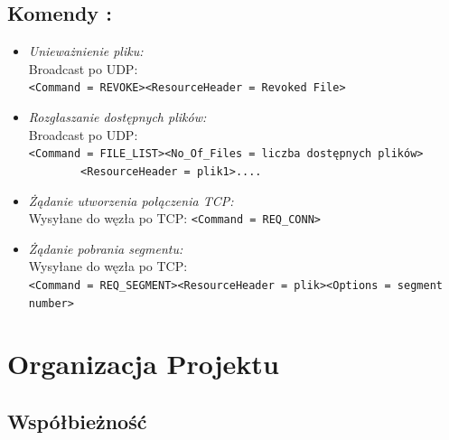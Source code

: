 \documentclass[11pt,oneside]{book}
\newcommand{\+}{\discretionary{\mbox{\scriptsize$\hookleftarrow$}}{}{}}
\begin{document}
\section{Komendy :}
\begin{itemize}
\item
\textsl{Unieważnienie pliku:}\\
Broadcast po UDP: \\ \verb|<Command = REVOKE><ResourceHeader = Revoked File>|
\item
\textsl{Rozgłaszanie dostępnych plików:}\\
Broadcast po UDP: \\ \verb|<Command = FILE_LIST><No_Of_Files = liczba dostępnych plików>| \\
\verb|        <ResourceHeader = plik1>....|
\item
\textsl{Żądanie utworzenia połączenia TCP:}\\
Wysyłane do węzła po TCP: \verb|<Command = REQ_CONN>|
\item
\textsl{Żądanie pobrania segmentu:}\\
Wysyłane do węzła po TCP: \\ \verb|<Command = REQ_SEGMENT><ResourceHeader = plik><Options = segment number>|
\end{itemize}
\chapter{Organizacja Projektu}
\section{Współbieżność}
\end{document}
